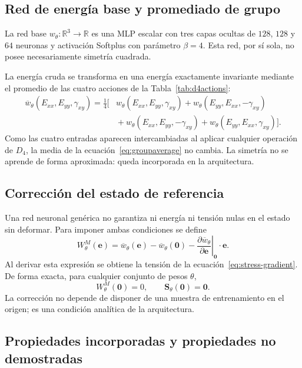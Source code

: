\documentclass[11pt,a4paper]{article}
\newcommand{\Svec}{\ensuremath{\bm S}}
\newcommand{\evec}{\ensuremath{\bm e}}
\newcommand{\Dfour}{\ensuremath{D_4}}
\newcommand{\W}{\ensuremath{W}}
\begin{document}
\subsection{Red de energía base y promediado de grupo}

La red base \(w_\theta:\mathbb R^3\rightarrow\mathbb R\) es una MLP escalar
con tres capas ocultas de \(128\), \(128\) y \(64\) neuronas y activación
Softplus con parámetro \(\beta=4\). Esta red, por sí sola, no posee
necesariamente simetría cuadrada.

La energía cruda se transforma en una energía exactamente invariante mediante
el promedio de las cuatro acciones de la Tabla~\ref{tab:d4actions}:
\[
\begin{aligned}
\overline w_\theta(E_{xx},E_{yy},\gamma_{xy})=\frac14\big[&
w_\theta(E_{xx},E_{yy},\gamma_{xy})
{}+w_\theta(E_{yy},E_{xx},-\gamma_{xy})\\
&{}+w_\theta(E_{xx},E_{yy},-\gamma_{xy})
{}+w_\theta(E_{yy},E_{xx},\gamma_{xy})\big].
\end{aligned}
\label{eq:groupaverage}
\]
Como las cuatro entradas aparecen intercambiadas al aplicar cualquier
operación de \(\Dfour\), la media de la ecuación~\eqref{eq:groupaverage} no
cambia. La simetría no se aprende de forma aproximada: queda incorporada en
la arquitectura.

\subsection{Corrección del estado de referencia}

Una red neuronal genérica no garantiza ni energía ni tensión nulas en el
estado sin deformar. Para imponer ambas condiciones se define
\[
\boxed{
\W_\theta^M(\evec)
=\overline w_\theta(\evec)-\overline w_\theta(\bm0)
-\left.
\frac{\partial\overline w_\theta}{\partial\evec}
\right|_{\bm0}\cdot\evec .}
\label{eq:reference-correction}
\]
Al derivar esta expresión se obtiene la tensión de la
ecuación~\eqref{eq:stress-gradient}. De forma exacta, para cualquier conjunto
de pesos \(\theta\),
\[
 \W_\theta^M(\bm0)=0,\qquad
 \Svec_\theta(\bm0)=\bm0.
\]
La corrección no depende de disponer de una muestra de entrenamiento en el
origen; es una condición analítica de la arquitectura.

\subsection{Propiedades incorporadas y propiedades no demostradas}
\end{document}
